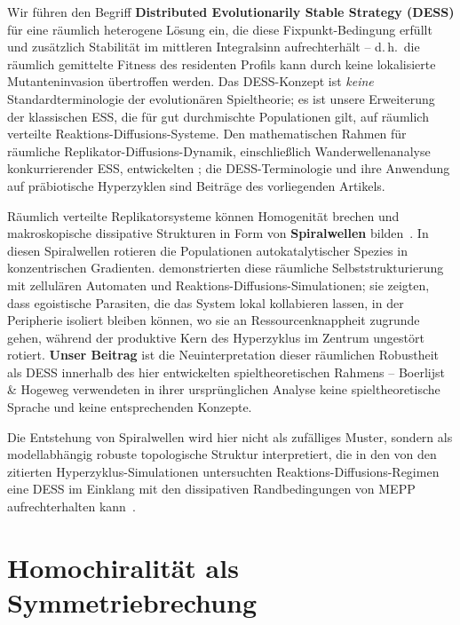 \documentclass[12pt,a4paper]{article}
\theoremstyle{remark}
\begin{document}
Wir führen den Begriff \textbf{Distributed Evolutionarily Stable Strategy (DESS)} für eine räumlich heterogene Lösung ein, die diese Fixpunkt-Bedingung erfüllt und zusätzlich Stabilität im mittleren Integralsinn aufrechterhält -- d.\,h.\ die räumlich gemittelte Fitness des residenten Profils kann durch keine lokalisierte Mutanteninvasion übertroffen werden. Das DESS-Konzept ist \emph{keine} Standardterminologie der evolutionären Spieltheorie; es ist unsere Erweiterung der klassischen ESS, die für gut durchmischte Populationen gilt, auf räumlich verteilte Reaktions-Diffusions-Systeme. Den mathematischen Rahmen für räumliche Replikator-Diffusions-Dynamik, einschließlich Wanderwellenanalyse konkurrierender ESS, entwickelten \citet{ReplicatorDiffusion}; die DESS-Terminologie und ihre Anwendung auf präbiotische Hyperzyklen sind Beiträge des vorliegenden Artikels.

Räumlich verteilte Replikatorsysteme können Homogenität brechen und makroskopische dissipative Strukturen in Form von \textbf{Spiralwellen} bilden~\citep{SpiralWaves}. In diesen Spiralwellen rotieren die Populationen autokatalytischer Spezies in konzentrischen Gradienten. \citet{SpiralWaves,HypercycleInfinite} demonstrierten diese räumliche Selbststrukturierung mit zellulären Automaten und Reaktions-Diffusions-Simulationen; sie zeigten, dass egoistische Parasiten, die das System lokal kollabieren lassen, in der Peripherie isoliert bleiben können, wo sie an Ressourcenknappheit zugrunde gehen, während der produktive Kern des Hyperzyklus im Zentrum ungestört rotiert. \textbf{Unser Beitrag} ist die Neuinterpretation dieser räumlichen Robustheit als DESS innerhalb des hier entwickelten spieltheoretischen Rahmens -- Boerlijst \& Hogeweg verwendeten in ihrer ursprünglichen Analyse keine spieltheoretische Sprache und keine entsprechenden Konzepte.

Die Entstehung von Spiralwellen wird hier nicht als zufälliges Muster, sondern als modellabhängig robuste topologische Struktur interpretiert, die in den von den zitierten Hyperzyklus-Simulationen untersuchten Reaktions-Diffusions-Regimen eine DESS im Einklang mit den dissipativen Randbedingungen von MEPP aufrechterhalten kann~\citep{HypercycleInfinite}.

\section{Homochiralität als Symmetriebrechung}
\label{sec:chirality}
\end{document}
